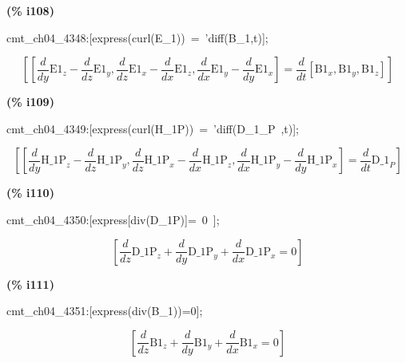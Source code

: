 \documentclass[fleqn]{article}
\begin{document}
\noindent
\begin{minipage}[t]{4.000000em}\color{red}\bfseries
(\% i108)	
\end{minipage}
\begin{minipage}[t]{\textwidth}\color{blue}
cmt\_ch04\_4348:[express(curl(E\_1))\ =\ 'diff(B\_1,t)];
\end{minipage}
\[\displaystyle \tag{\% o108} 
\left[ \left[ \frac{d}{d y} {{\ensuremath{\mathrm{E1}}}_z}-\frac{d}{d z} {{\ensuremath{\mathrm{E1}}}_y}\operatorname{,}\frac{d}{d z} {{\ensuremath{\mathrm{E1}}}_x}-\frac{d}{d x} {{\ensuremath{\mathrm{E1}}}_z}\operatorname{,}\frac{d}{d x} {{\ensuremath{\mathrm{E1}}}_y}-\frac{d}{d y} {{\ensuremath{\mathrm{E1}}}_x}\right] =\frac{d}{d t} \left[ {{\ensuremath{\mathrm{B1}}}_x}\operatorname{,}{{\ensuremath{\mathrm{B1}}}_y}\operatorname{,}{{\ensuremath{\mathrm{B1}}}_z}\right] \right] \mbox{}
\]


\noindent
\begin{minipage}[t]{4.000000em}\color{red}\bfseries
(\% i109)	
\end{minipage}
\begin{minipage}[t]{\textwidth}\color{blue}
cmt\_ch04\_4349:[express(curl(H\_1P))\ =\ 'diff(D\_1\_P\ ,t)];
\end{minipage}
\[\displaystyle \tag{\% o109} 
\left[ \left[ \frac{d}{d y} {{\ensuremath{\mathrm{H\_ 1P}}}_z}-\frac{d}{d z} {{\ensuremath{\mathrm{H\_ 1P}}}_y}\operatorname{,}\frac{d}{d z} {{\ensuremath{\mathrm{H\_ 1P}}}_x}-\frac{d}{d x} {{\ensuremath{\mathrm{H\_ 1P}}}_z}\operatorname{,}\frac{d}{d x} {{\ensuremath{\mathrm{H\_ 1P}}}_y}-\frac{d}{d y} {{\ensuremath{\mathrm{H\_ 1P}}}_x}\right] =\frac{d}{d t} {{\ensuremath{\mathrm{D\_ 1}}}_P}\right] \mbox{}
\]


\noindent
\begin{minipage}[t]{4.000000em}\color{red}\bfseries
(\% i110)	
\end{minipage}
\begin{minipage}[t]{\textwidth}\color{blue}
cmt\_ch04\_4350:[express[div(D\_1P)]=\ 0\ ];
\end{minipage}
\[\displaystyle \tag{\% o110} 
\left[ \frac{d}{d z} {{\ensuremath{\mathrm{D\_ 1P}}}_z}+\frac{d}{d y} {{\ensuremath{\mathrm{D\_ 1P}}}_y}+\frac{d}{d x} {{\ensuremath{\mathrm{D\_ 1P}}}_x}=0\right] \mbox{}
\]


\noindent
\begin{minipage}[t]{4.000000em}\color{red}\bfseries
(\% i111)	
\end{minipage}
\begin{minipage}[t]{\textwidth}\color{blue}
cmt\_ch04\_4351:[express(div(B\_1))=0];
\end{minipage}
\[\displaystyle \tag{\% o111} 
\left[ \frac{d}{d z} {{\ensuremath{\mathrm{B1}}}_z}+\frac{d}{d y} {{\ensuremath{\mathrm{B1}}}_y}+\frac{d}{d x} {{\ensuremath{\mathrm{B1}}}_x}=0\right] \mbox{}
\]
\end{document}
